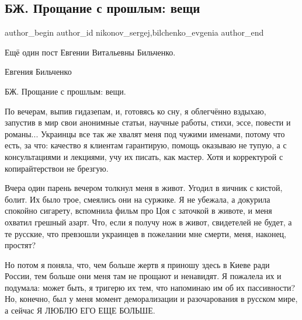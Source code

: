  
 
 
 
 
 
\subsection{БЖ. Прощание с прошлым: вещи}
\label{sec:18_09_2021.fb.nikonov_sergej.2.bilchenko_proschanie_s_proshlim_veschi}
 
\ifcmt
 author_begin
   author_id nikonov_sergej,bilchenko_evgenia
 author_end
\fi

Ещё один пост Евгении Витальевны Бильченко. 

Евгения Бильченко

БЖ. Прощание с прошлым: вещи.

По вечерам, выпив гидазепам, и, готовясь ко сну, я облегчённо вздыхаю, запустив
в мир свои анонимные статьи, научные работы, стихи, эссе, повести и романы...
Украинцы все так же хвалят меня под чужими именами, потому что есть, за что:
качество я клиентам гарантирую, помощь оказываю не тупую, а с консультациями и
лекциями, учу их писать, как мастер. Хотя и корректурой с копирайтерствои не
брезгую.


Вчера один парень вечером толкнул меня в живот. Угодил в яичник с кистой,
болит. Их было трое, смеялись они на суржике. Я не убежала, а докурила спокойно
сигарету, вспомнила фильм про Цоя с заточкой в животе, и меня охватил грешный
азарт. Что, если я получу нож в живот, свидетелей не будет, а те русские, что
превзошли украинцев в пожелании мне смерти, меня, наконец, простят?

Но потом я поняла, что, чем больше жертв я приношу здесь в Киеве ради России,
тем больше они меня там не прощают и ненавидят. Я пожалела их и подумала: может
быть, я тригерю их тем, что напоминаю им об их пассивности? Но, конечно, был у
меня момент деморализации и разочарования в русском мире, а сейчас Я ЛЮБЛЮ ЕГО
ЕЩЕ БОЛЬШЕ.

